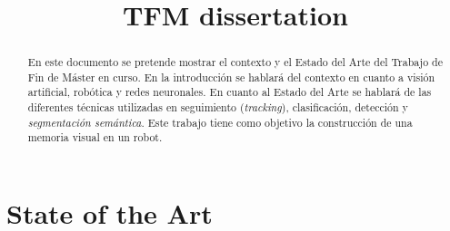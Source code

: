 \documentclass{bmvc2k}
\title{TFM dissertation}
\begin{document}
\maketitle

\begin{abstract}
En este documento se pretende mostrar el contexto y el Estado del Arte del Trabajo de Fin de Máster en curso. En la introducción se hablará del contexto en cuanto a visión artificial, robótica y redes neuronales. En cuanto al Estado del Arte se hablará de las diferentes técnicas utilizadas en seguimiento (\textit{tracking}), clasificación, detección y \textit{segmentación semántica}. Este trabajo tiene como objetivo la construcción de una memoria visual en un robot.
\end{abstract}

\section{State of the Art}

\label{sec:intro}

\end{document}
